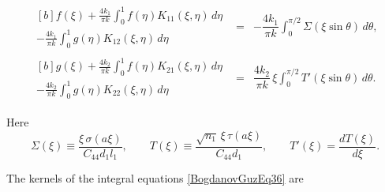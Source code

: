 \begin{equation}
	\label{BogdanovGuzEq36}
	\begin{array}{rcl}
		
		\begin{multlined}[b]
			f(\xi)
			+
			\frac{4k_{1}}{\pi k}
			\int_{0}^{1} f(\eta)K_{11}(\xi,\eta)\,d\eta
			\\[-1em]
			-
			\frac{4k_{1}}{\pi k}
			\int_{0}^{1} g(\eta)K_{12}(\xi,\eta)\,d\eta
		\end{multlined}
		&=&
		-\dfrac{4k_{1}}{\pi k}
		\displaystyle\int_{0}^{\pi/2}
		\Sigma(\xi\sin\theta)\,d\theta ,
		\\[1em]
		\begin{multlined}[b]
			g(\xi)
			+
			\frac{4k_{2}}{\pi k}
			\int_{0}^{1} f(\eta)K_{21}(\xi,\eta)\,d\eta
			\\[-1em]
			-
			\frac{4k_{2}}{\pi k}
			\int_{0}^{1} g(\eta)K_{22}(\xi,\eta)\,d\eta
		\end{multlined}
		&=&
		\dfrac{4k_{2}}{\pi k}\,
		\xi
		\displaystyle\int_{0}^{\pi/2}
		T'(\xi\sin\theta)\,d\theta .	
	\end{array}
\end{equation}

Here
\[
\Sigma(\xi)\equiv
\frac{\xi\,\sigma(a\xi)}{C_{44}d_{1}l_{1}},
\qquad
T(\xi)\equiv
\frac{\sqrt{n_{1}}\,\xi\,\tau(a\xi)}{C_{44}d_{1}},
\qquad
T'(\xi)=\frac{dT(\xi)}{d\xi}.
\]

The kernels of the integral equations \eqref{BogdanovGuzEq36} are

